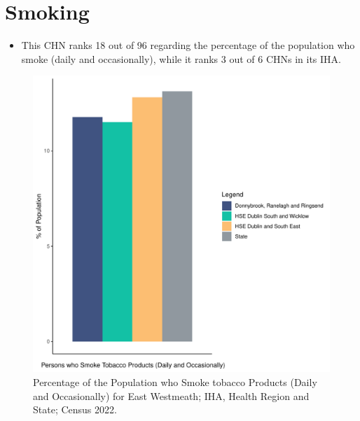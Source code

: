 \documentclass{article}
\begin{document}
\pagebreak

\section{Smoking}\label{sect:Smoking}
\begin{itemize}
\item This CHN ranks  18 out of 96 regarding the percentage of the population who smoke (daily and occasionally), while it ranks   3 out of 6 CHNs in its IHA.
\end{itemize}
\begin{figure}[H]
	\centering
	\includegraphics[width = 120mm]{../figures/SmokingED.pdf}
	\caption{Percentage of the Population who Smoke tobacco Products (Daily and Occasionally) for East Westmeath; IHA, Health Region and State; Census 2022.}
	\label{fig:2ae19629-1a6a-13a3-e055-000000000001}
	\end{figure}
	
\end{document}
